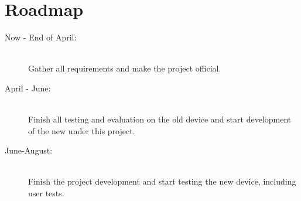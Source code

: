 \documentclass[a4paper,12pt]{article}
\begin{document}
\section*{Roadmap}
\begin{description}
    \item[Now - End of April:] \hfill \\
    Gather all requirements and make the project official.  
    \item[April - June:]\hfill \\
    Finish all testing and evaluation on the old device and start development of the new under this project.
    \item[June-August:]\hfill \\
    Finish the project development and start testing the new device, including user tests.
\end{description}
\end{document}
